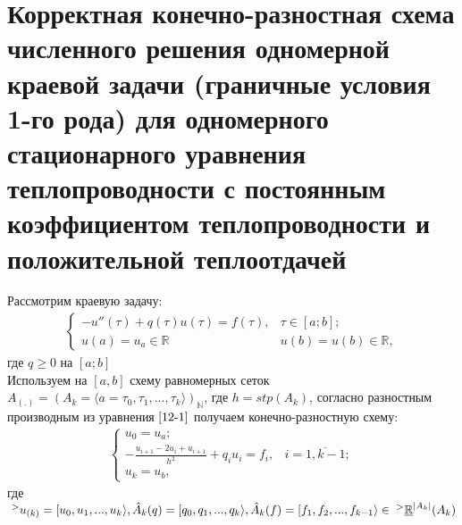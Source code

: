 \documentclass[__main__.tex]{subfiles}
\begin{document}
\section{Корректная конечно-разностная схема численного решения одномерной краевой задачи (граничные условия 1-го рода) для одномерного стационарного уравнения теплопроводности с постоянным коэффициентом теплопроводности и положительной теплоотдачей}

Рассмотрим краевую задачу:
\begin{gather}
	\begin{cases}
		-u''(\tau)+q(\tau)u(\tau)=f(\tau), & \tau\in[a;b];\\
		u(a) = u_a \in \mathbb{R} & u(b) = u(b) \in \mathbb{R}, 
	\end{cases}
	\label{12-1}
\end{gather}
где $q\ge0$ на $[a;b]$\\
Используем на $[a,b]$ схему равномерных сеток $A_{(.)}=(A_k=\langle a=\tau_0,\tau_1,...,\tau_k\rangle )_{\mathbb{N}}$, где $h=stp(A_k)$, согласно разностным производным из уравнения $\ref{12-1}$ получаем конечно-разностную схему:
\begin{gather}
	\begin{cases}
		u_0 = u_a;\\
		-\frac{u_{i+1}-2u_i+u_{i+1}}{h^2} + q_iu_i = f_i, & i=\overline{1,k-1};\\
		u_k=u_b,
	\end{cases}
	\label{12-2}
\end{gather}	
где $\;^>u_{(k)} = [u_0,u_1,...,u_k\rangle, \hat{A}_k(q) = [q_0,q_1,...,q_k\rangle,\\
\hat{A}_k(f) = [f_1, f_2,...,f_{k-1}\rangle \in \;^>\underline{\mathbb{R}}^{|A_k|}(A_k)$\\
\end{document}
